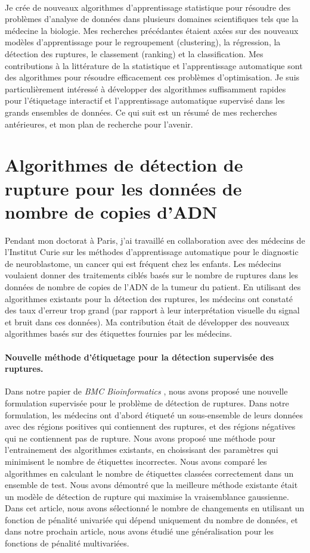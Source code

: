 \documentclass{article}
\begin{document}
\mbox{ }

Je crée de nouveaux algorithmes d'apprentissage statistique pour
résoudre des problèmes d'analyse de données dans plusieurs domaines
scientifiques tels que la médecine la biologie. Mes recherches
précédantes étaient axées sur des nouveaux modèles d'apprentissage
pour le regroupement (clustering), la régression, la détection des
ruptures, le classement (ranking) et la classification. Mes
contributions à la littérature de la statistique et l'apprentissage
automatique sont des algorithmes pour résoudre efficacement ces
problèmes d'optimisation. Je suis particulièrement intéressé à
développer des algorithmes suffisamment rapides pour l'étiquetage
interactif et l'apprentissage automatique supervisé dans les grands
ensembles de données. Ce qui suit est un résumé de mes recherches
antérieures, et mon plan de recherche pour l'avenir.

\section{Algorithmes de détection de rupture pour les données de nombre de copies d'ADN}

Pendant mon doctorat à Paris, j'ai travaillé en collaboration avec des
médecins de l'Institut Curie sur les méthodes d'apprentissage
automatique pour le diagnostic de neuroblastome, un cancer qui est
fréquent chez les enfants. Les médecins voulaient donner des
traitements ciblés basés sur le nombre de ruptures dans les données de
nombre de copies de l'ADN de la tumeur du patient. En utilisant des
algorithmes existants pour la détection des ruptures, les médecins ont
constaté des taux d'erreur trop grand (par rapport à leur
interprétation visuelle du signal et bruit dans ces données). Ma
contribution était de développer des nouveaux algorithmes basés sur
des étiquettes fournies par les médecins.

\paragraph{Nouvelle méthode d'étiquetage pour la détection supervisée des ruptures.}

Dans notre papier de \emph{BMC Bioinformatics}
\citep{HOCKING-breakpoints}, nous avons proposé une nouvelle
formulation supervisée pour le problème de détection de ruptures. Dans
notre formulation, les médecins ont d'abord étiqueté un sous-ensemble
de leurs données avec des régions positives qui contiennent des
ruptures, et des régions négatives qui ne contiennent pas de rupture.
Nous avons proposé une méthode pour l'entrainement des algorithmes
existants, en choissisant des paramètres qui minimisent le nombre de
étiquettes incorrectes. Nous avons comparé les algorithmes en
calculant le nombre de étiquettes classées correctement dans un
ensemble de test. Nous avons démontré que la meilleure méthode
existante était un modèle de détection de rupture qui maximise la
vraisemblance gaussienne.  Dans cet article, nous avons sélectionné le
nombre de changements en utilisant un fonction de pénalité univariée
qui dépend uniquement du nombre de données, et dans notre prochain
article, nous avons étudié une généralisation pour les fonctions de
pénalité multivariées.
\end{document}
